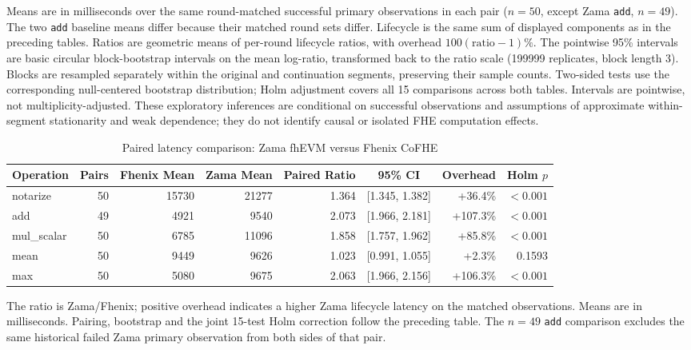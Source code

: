 \noindent
Means are in milliseconds over the same round-matched successful primary
observations in each pair ($n=50$, except Zama \texttt{add}, $n=49$).
The two \texttt{add} baseline means differ because their matched round sets differ.
Lifecycle is the same sum of displayed components as in the preceding tables.
Ratios are geometric means of per-round lifecycle ratios, with overhead
$100(\mathrm{ratio}-1)\%$. The pointwise 95\% intervals are basic circular
block-bootstrap intervals on the mean log-ratio, transformed back to the ratio
scale (199999 replicates, block length 3). Blocks are resampled separately
within the original and continuation segments, preserving their sample counts.
Two-sided tests use the corresponding null-centered bootstrap distribution;
Holm adjustment covers all 15 comparisons across both tables. Intervals are
pointwise, not multiplicity-adjusted. These exploratory inferences are
conditional on successful observations and assumptions of approximate
within-segment stationarity and weak dependence; they do not identify causal
or isolated FHE computation effects.


\begin{table}[!t]
\caption{Paired latency comparison: Zama fhEVM versus Fhenix CoFHE}
\label{tab:zama-fhenix-lifecycle-comparison}
\centering
\footnotesize
\setlength{\tabcolsep}{5pt}
\begin{tabular}{|l|r|r|r|r|c|r|r|}
\hline
\textbf{Operation} &
\textbf{Pairs} &
\textbf{Fhenix Mean} &
\textbf{Zama Mean} &
\textbf{Paired Ratio} &
\textbf{95\% CI} &
\textbf{Overhead} &
\textbf{Holm \(p\)} \\
\hline

notarize & 50 & 15730 & 21277 & 1.364 & [1.345, 1.382] & +36.4\% & $<0.001$ \\
add & 49 & 4921 & 9540 & 2.073 & [1.966, 2.181] & +107.3\% & $<0.001$ \\
mul\_scalar & 50 & 6785 & 11096 & 1.858 & [1.757, 1.962] & +85.8\% & $<0.001$ \\
mean & 50 & 9449 & 9626 & 1.023 & [0.991, 1.055] & +2.3\% & 0.1593 \\
max & 50 & 5080 & 9675 & 2.063 & [1.966, 2.156] & +106.3\% & $<0.001$ \\
\hline
\end{tabular}
\end{table}

\noindent
The ratio is Zama/Fhenix; positive overhead indicates a higher Zama lifecycle
latency on the matched observations. Means are in milliseconds. Pairing,
bootstrap and the joint 15-test Holm correction follow the preceding table.
The $n=49$ \texttt{add} comparison excludes the same historical failed Zama
primary observation from both sides of that pair.
